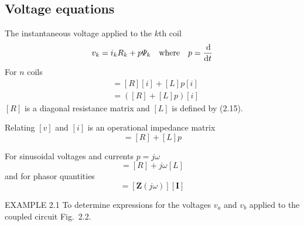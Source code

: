 \documentclass[a4paper,numbers=noenddot,12pt]{scrbook}
\begin{document}
        \subsection{Voltage equations}
        The instantaneous voltage applied to the $k$th coil
        \begin{equation}
            v_k = i_k R_k + p \varPsi_k \quad \text{where} \quad p = \dfrac{\dif}{\dif t}
            \label{eq:Eq2.17}
        \end{equation}
        For $n$ coils
        \begin{align}
            [v] & = [R][i] + [L]p[i] \nonumber \\
            & = ([R] + [L] p)[i]
            \label{eq:Eq2.18}
        \end{align}
        $[R]$ is a diagonal resistance matrix and $[L]$ is defined by (2.15).

        Relating $[v]$ and $[i]$ is an operational impedance matrix
        \begin{equation}
            [Z(p)] = [R] + [L]p
            \label{eq:Eq2.19}
        \end{equation}

        For sinusoidal voltages and currents $p = j \omega$
        \begin{equation}
            [\mathbf{Z} (j \omega)] = [R] + j \omega[L]
            \label{eq:Eq2.20}
        \end{equation}
        and for phasor quantities
        \begin{equation}
            [\mathbf{V}] = [\mathbf{Z} (j \omega)] [\mathbf{I}]
            \label{eq:Eq2.21}
        \end{equation}

        \textsc{EXAMPLE} 2.1 To determine expressions for the voltages $v_a$ and $v_b$ applied to the coupled circuit Fig.\ 2.2.
\end{document}
